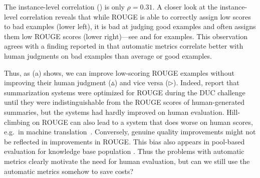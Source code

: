 The instance-level correlation () is only $\rho = 0.31$.
A closer look at the instance-level correlation reveals that
while ROUGE is able to correctly assign low scores to bad examples (lower left),
it is bad at judging good examples and often assigns them low ROUGE scores (lower right)---see  and  for examples.
This observation agrees with a finding reported in \citet{novikova2017why} that automatic metrics correlate better with human judgments on bad examples than average or good examples. 


Thus, as (a) shows, we can improve low-scoring ROUGE examples without improving their human judgment ($\vartriangle$) and vice versa ($\triangleright$).
Indeed, \citet{conroy2008mind} report that summarization systems were optimized for ROUGE during the DUC challenge~\citep{dang2006overview}
until they were indistinguishable from the ROUGE scores of human-generated summaries, but the systems had hardly improved on human evaluation.
Hill-climbing on ROUGE can also lead to a system that does worse on human scores, e.g.\ in machine translation~\citep{wu2016google}.
Conversely, genuine quality improvements might not be reflected in improvements in ROUGE\@.
This bias also appears in pool-based evaluation for knowledge base population \citep{chaganty2017unbiased}.
Thus the problems with automatic metrics clearly motivate the need for human evaluation,
but can we still use the automatic metrics somehow to save costs?


